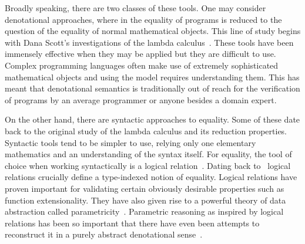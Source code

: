 Broadly speaking, there are two classes of these tools. One may
consider denotational approaches, where in the equality of programs is
reduced to the question of the equality of normal mathematical
objects. This line of study begins with Dana Scott's investigations of
the lambda calculus~\citep{TODO-CITE-SCOTT}. These tools have been
immensely effective when they may be applied but they are difficult to
use. Complex programming languages often make use of extremely
sophisticated mathematical objects and using the model requires
understanding them. This has meant that denotational semantics is
traditionally out of reach for the verification of programs by an
average programmer or anyone besides a domain expert.

On the other hand, there are syntactic approaches to equality. Some of
these date back to the original study of the lambda calculus and its
reduction properties. Syntactic tools tend to be simpler to use,
relying only one elementary mathematics and an understanding of the
syntax itself. For equality, the tool of choice when working
syntactically is a logical relation~\citep{TODO-TAIT-AMAL}. Dating
back to~\citet{TODO-TAIT} logical relations crucially define a
type-indexed notion of equality. Logical relations have proven
important for validating certain obviously desirable properties such
as function extensionality.
They have also given rise to a powerful
theory of data abstraction called
parametricity~\citep{TODO-REYNOLDS}. Parametric reasoning as inspired
by logical relations has been so important that there have even been
attempts to reconstruct it in a purely abstract denotational
sense~\citep{TODO-FIBRATIONAL}.

